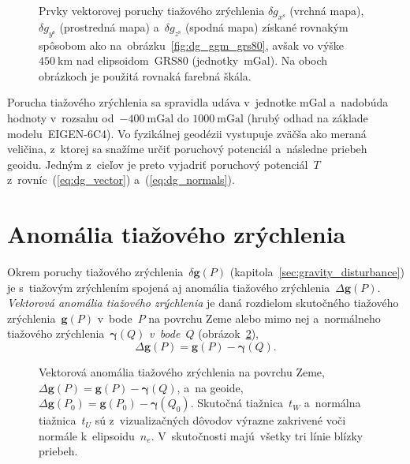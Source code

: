 \documentclass[a4paper, 12pt]{book}
\let\vec\mathbf
\begin{document}
\begin{figure}
\caption{Prvky vektorovej poruchy tiažového zrýchlenia $\delta 
g_{x^\mathrm{s}}$ (vrchná mapa), $\delta g_{y^\mathrm{s}}$ (prostredná mapa) 
a~$\delta g_{z^\mathrm{s}}$ (spodná mapa) získané rovnakým spôsobom ako 
na~obrázku~\ref{fig:dg_ggm_grs80}, avšak vo výške~$450\ \mathrm{km}$ nad 
elipsoidom~GRS80 (jednotky~$\mathrm{mGal}$).  Na oboch obrázkoch je použitá 
rovnaká farebná škála.}
\label{fig:dg_ggm_450km}
\end{figure}

Porucha tiažového zrýchlenia sa spravidla udáva v~jednotke mGal a~nadobúda 
hodnoty v~rozsahu od~$-400\ \mathrm{mGal}$ do $1000\ \mathrm{mGal}$ (hrubý 
odhad na základe modelu~EIGEN-6C4).  Vo fyzikálnej geodézii vystupuje zväčša 
ako meraná veličina, z~ktorej sa snažíme určiť poruchový potenciál a~následne 
priebeh geoidu.  Jedným z~cieľov je preto vyjadriť poruchový potenciál~$T$ 
z~rovníc~(\ref{eq:dg_vector}) a~(\ref{eq:dg_normals}).





\section{Anomália tiažového zrýchlenia}
\label{sec:gravity_anomaly}

Okrem poruchy tiažového zrýchlenia~$\delta \vec g(P)$ 
(kapitola~\ref{sec:gravity_disturbance}) je s~tiažovým zrýchlením spojená aj 
anomália tiažového zrýchlenia~$\Delta \vec g(P)$.  \emph{Vektorová anomália 
tiažového zrýchlenia} je daná rozdielom skutočného tiažového zrýchlenia~$\vec 
g(P)$ v~bode~$P$ na povrchu Zeme alebo mimo nej a~normálneho tiažového 
zrýchlenia~$\boldsymbol\gamma(Q)$ \emph{v~bode~$Q$} 
(obrázok~\ref{fig:gravity_anomaly}),
%
\begin{equation}
\label{eq:Dg_vector_earth}
\Delta \vec g(P) = \vec g(P) - \boldsymbol\gamma(Q).
\end{equation}

\begin{figure}[bt]
\centering

\caption{Vektorová anomália tiažového zrýchlenia na povrchu Zeme,~$\Delta \vec 
g(P) = \vec g(P) - \boldsymbol \gamma(Q)$, a~na geoide, $\Delta \vec g(P_0) 
= \vec g(P_0) - \boldsymbol\gamma(Q_0)$.  Skutočná tiažnica~$t_W$ a~normálna 
tiažnica~$t_U$ sú z~vizualizačných dôvodov výrazne zakrivené voči normále 
k~elipsoidu~$n_e$.  V~skutočnosti majú~všetky tri línie blízky priebeh.}
\label{fig:gravity_anomaly}
\end{figure}
\end{document}

